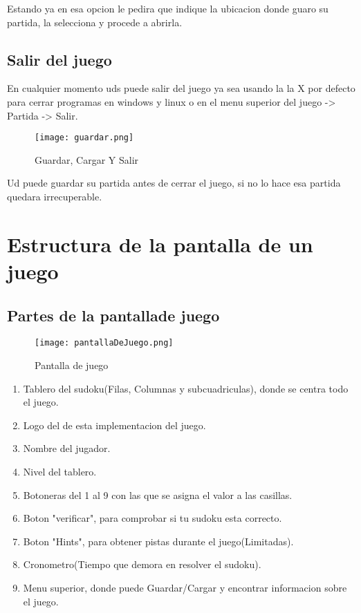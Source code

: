 \documentclass[11pt,fleqn]{book} %
\begin{document}
Estando ya en esa opcion le pedira que indique la ubicacion donde guaro su partida, la selecciona y procede a abrirla.

\section{Salir del juego}

En cualquier momento uds puede salir del juego ya sea usando la la X por defecto para cerrar programas en windows y linux o en el menu superior del juego -> Partida -> Salir.

\begin{figure}[H]
\centering\texttt{[image: guardar.png]}
\caption{Guardar, Cargar Y Salir}
\end{figure}

Ud puede guardar su partida antes de cerrar el juego, si no lo hace esa partida quedara irrecuperable.







\chapter{Estructura de la pantalla de un juego}

\section{Partes de la pantallade juego}

\begin{figure}[H]
\centering\texttt{[image: pantallaDeJuego.png]}
\caption{Pantalla de juego}
\end{figure}

\begin{enumerate}
\item Tablero del sudoku(Filas, Columnas y subcuadriculas), donde se centra todo el juego.
\item Logo del de esta implementacion del juego.
\item Nombre del jugador.
\item Nivel del tablero.
\item Botoneras del 1 al 9 con las que se asigna el valor a las casillas.
\item Boton "verificar", para comprobar si tu sudoku esta correcto.
\item Boton "Hints", para obtener pistas durante el juego(Limitadas).
\item Cronometro(Tiempo que demora en resolver el sudoku).
\item Menu superior, donde puede Guardar/Cargar y encontrar informacion sobre el juego.

\end{enumerate}
\end{document}
